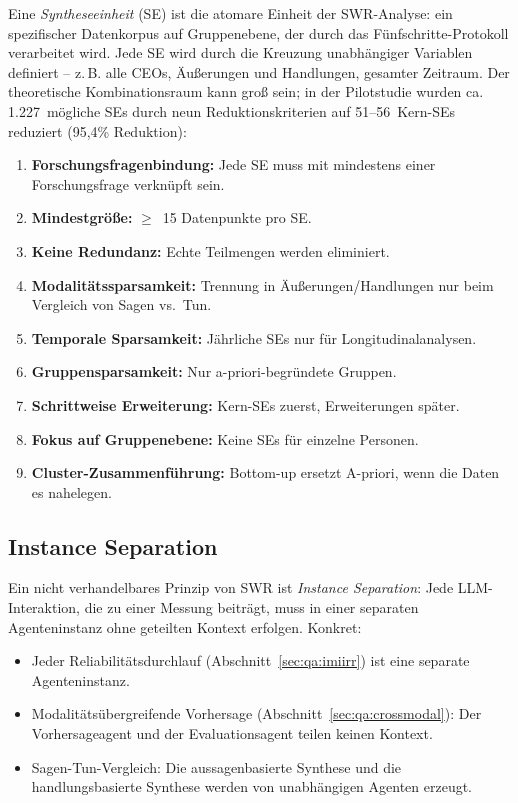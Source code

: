 \documentclass[11pt,a4paper]{article}
\begin{document}
Eine \emph{Syntheseeinheit} (SE) ist die atomare Einheit der SWR-Analyse: ein spezifischer Datenkorpus auf Gruppenebene, der durch das F\"unfschritte-Protokoll verarbeitet wird. Jede SE wird durch die Kreuzung unabh\"angiger Variablen definiert -- z.\,B. \glqq{}alle CEOs, \"Au\ss{}erungen und Handlungen, gesamter Zeitraum\grqq{}. Der theoretische Kombinationsraum kann gro\ss{} sein; in der Pilotstudie wurden ca. 1.227~m\"ogliche SEs durch neun Reduktionskriterien auf 51--56~Kern-SEs reduziert (95,4\% Reduktion):

\begin{enumerate}[nosep]
  \item \textbf{Forschungsfragenbindung:} Jede SE muss mit mindestens einer Forschungsfrage verkn\"upft sein.
  \item \textbf{Mindestgr\"o\ss{}e:} $\geq$~15 Datenpunkte pro SE.
  \item \textbf{Keine Redundanz:} Echte Teilmengen werden eliminiert.
  \item \textbf{Modalit\"atssparsamkeit:} Trennung in \"Au\ss{}erungen/Handlungen nur beim Vergleich von Sagen vs.\ Tun.
  \item \textbf{Temporale Sparsamkeit:} J\"ahrliche SEs nur f\"ur Longitudinalanalysen.
  \item \textbf{Gruppensparsamkeit:} Nur a-priori-begr\"undete Gruppen.
  \item \textbf{Schrittweise Erweiterung:} Kern-SEs zuerst, Erweiterungen sp\"ater.
  \item \textbf{Fokus auf Gruppenebene:} Keine SEs f\"ur einzelne Personen.
  \item \textbf{Cluster-Zusammenf\"uhrung:} Bottom-up ersetzt A-priori, wenn die Daten es nahelegen.
\end{enumerate}


\subsection{Instance Separation}
\label{sec:method:instance}

Ein nicht verhandelbares Prinzip von SWR ist \emph{Instance Separation}: Jede LLM-Interaktion, die zu einer Messung beitr\"agt, muss in einer separaten Agenteninstanz ohne geteilten Kontext erfolgen. Konkret:

\begin{itemize}[nosep]
  \item Jeder Reliabilit\"atsdurchlauf (Abschnitt~\ref{sec:qa:imiirr}) ist eine separate Agenteninstanz.
  \item Modalit\"ats\"ubergreifende Vorhersage (Abschnitt~\ref{sec:qa:crossmodal}): Der Vorhersageagent und der Evaluationsagent teilen keinen Kontext.
  \item Sagen-Tun-Vergleich: Die aussagenbasierte Synthese und die handlungsbasierte Synthese werden von unabh\"angigen Agenten erzeugt.
\end{itemize}
\end{document}
